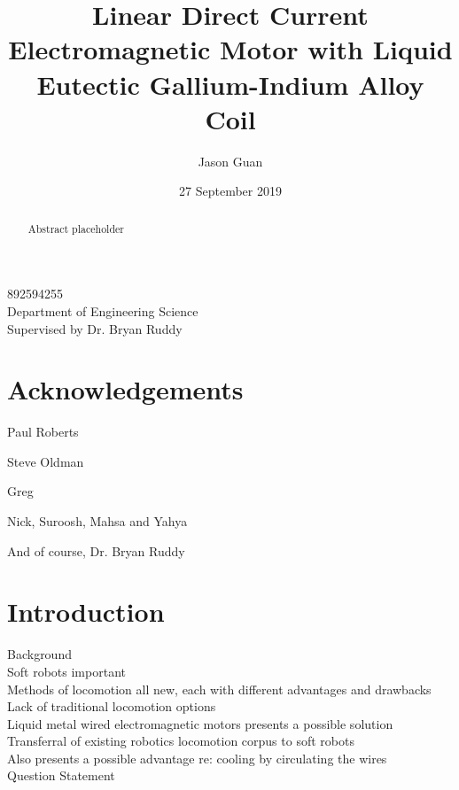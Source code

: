 \documentclass[a4paper]{article}
\title{Linear Direct Current Electromagnetic Motor with Liquid Eutectic Gallium-Indium Alloy Coil}
\author{Jason Guan}
\date{27 September 2019}
\begin{document}
\maketitle
\begin{center}
	892594255\\
	Department of Engineering Science\\
	Supervised by Dr. Bryan Ruddy
\end{center}

\newpage

\begin{abstract}
Abstract placeholder
\end{abstract}

\newpage

\section*{Acknowledgements}
Paul Roberts 

Steve Oldman 

Greg  

Nick, Suroosh, Mahsa and Yahya 

And of course, Dr. Bryan Ruddy 

\newpage

\tableofcontents

\newpage

\section{Introduction}
Background\\

Soft robots important \\

Methods of locomotion all new, each with different advantages and drawbacks \\

Lack of traditional locomotion options \\

Liquid metal wired electromagnetic motors presents a possible solution \\

Transferral of existing robotics locomotion corpus to soft robots \\

Also presents a possible advantage re: cooling by circulating the wires \\

Question Statement \\
\end{document}
